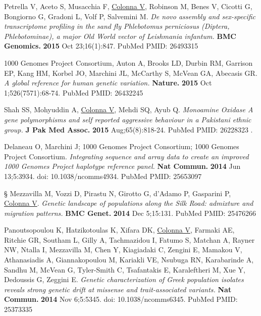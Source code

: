 \documentclass[openany]{book}
\begin{document}
\begin{enumerate}
    \item Petrella V, Aceto S, Musacchia F, \underline{Colonna V}, Robinson M, Benes V, Cicotti G, Bongiorno G, Gradoni L, Volf P, Salvemini M. \textit{De novo assembly and sex-specific transcriptome profiling in the sand fly Phlebotomus perniciosus (Diptera, Phlebotominae), a major Old World vector of Leishmania infantum.} \textbf{BMC Genomics. } \textbf{2015} Oct 23;16(1):847. PubMed PMID: 26493315

    \item 1000 Genomes Project Consortium, Auton A, Brooks LD, Durbin RM, Garrison EP, Kang HM, Korbel JO, Marchini JL, McCarthy S, McVean GA, Abecasis GR. \textit{A global reference for human genetic variation.}\textbf{ Nature. } \textbf{2015} Oct 1;526(7571):68-74. PubMed PMID: 26432245

    \item Shah SS, Mohyuddin A, \underline{Colonna V}, Mehdi SQ, Ayub Q. \textit{Monoamine Oxidase A gene polymorphisms and self reported aggressive behaviour in a Pakistani ethnic group.}\textbf{  J Pak Med Assoc. } \textbf{2015} Aug;65(8):818-24. PubMed PMID: 26228323 .


    \item Delaneau O, Marchini J; 1000 Genomes Project Consortium; 1000 Genomes Project Consortium. \textit{Integrating sequence and array data to create an improved 1000 Genomes Project haplotype reference panel.} \textbf{Nat Commun.} \textbf{2014} Jun 13;5:3934. doi: 10.1038/ncomms4934. PubMed PMID: 25653097

    {\color{blue} \item § Mezzavilla M, Vozzi D, Pirastu N, Girotto G, d'Adamo P, Gasparini P, \underline{Colonna V}. \textit{Genetic landscape of populations along the Silk Road: admixture and migration patterns.} \textbf{ BMC Genet.  }\textbf{2014} Dec 5;15:131. PubMed PMID: 25476266}

    \item Panoutsopoulou K, Hatzikotoulas K, Xifara DK, \underline{Colonna V}, Farmaki AE, Ritchie GR, Southam L, Gilly A, Tachmazidou I, Fatumo S, Matchan A, Rayner NW, Ntalla I, Mezzavilla M, Chen Y, Kiagiadaki C, Zengini E, Mamakou V, Athanasiadis A, Giannakopoulou M, Kariakli VE, Nsubuga RN, Karabarinde A, Sandhu M, McVean G, Tyler-Smith C, Tsafantakis E, Karaleftheri M, Xue Y, Dedoussis G, Zeggini E. \textit{Genetic characterization of Greek population isolates reveals strong genetic drift at missense and trait-associated variants.} \textbf{Nat Commun.} \textbf{2014} Nov 6;5:5345. doi: 10.1038/ncomms6345. PubMed PMID: 25373335


\end{enumerate}
\end{document}
